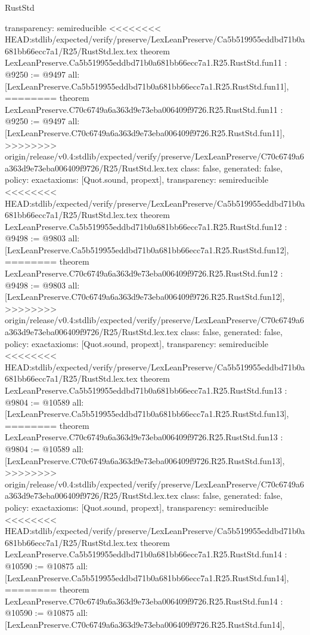 \begin{lexlean}{RustStd}
\begin{coremodule}
{\begin{coremodule}
{{{{{{{{{{{{{{  transparency: semireducible
}
<<<<<<<< HEAD:stdlib/expected/verify/preserve/LexLeanPreserve/Ca5b519955eddbd71b0a681bb66ecc7a1/R25/RustStd.lex.tex
theorem LexLeanPreserve.Ca5b519955eddbd71b0a681bb66ecc7a1.R25.RustStd.fun11 : @9250 := @9497 {
  all: [LexLeanPreserve.Ca5b519955eddbd71b0a681bb66ecc7a1.R25.RustStd.fun11],
========
theorem LexLeanPreserve.C70c6749a6a363d9e73eba006409f9726.R25.RustStd.fun11 : @9250 := @9497 {
  all: [LexLeanPreserve.C70c6749a6a363d9e73eba006409f9726.R25.RustStd.fun11],
>>>>>>>> origin/release/v0.4:stdlib/expected/verify/preserve/LexLeanPreserve/C70c6749a6a363d9e73eba006409f9726/R25/RustStd.lex.tex
  class: false,
  generated: false,
  policy: exact{axioms: [Quot.sound, propext]},
  transparency: semireducible
}
<<<<<<<< HEAD:stdlib/expected/verify/preserve/LexLeanPreserve/Ca5b519955eddbd71b0a681bb66ecc7a1/R25/RustStd.lex.tex
theorem LexLeanPreserve.Ca5b519955eddbd71b0a681bb66ecc7a1.R25.RustStd.fun12 : @9498 := @9803 {
  all: [LexLeanPreserve.Ca5b519955eddbd71b0a681bb66ecc7a1.R25.RustStd.fun12],
========
theorem LexLeanPreserve.C70c6749a6a363d9e73eba006409f9726.R25.RustStd.fun12 : @9498 := @9803 {
  all: [LexLeanPreserve.C70c6749a6a363d9e73eba006409f9726.R25.RustStd.fun12],
>>>>>>>> origin/release/v0.4:stdlib/expected/verify/preserve/LexLeanPreserve/C70c6749a6a363d9e73eba006409f9726/R25/RustStd.lex.tex
  class: false,
  generated: false,
  policy: exact{axioms: [Quot.sound, propext]},
  transparency: semireducible
}
<<<<<<<< HEAD:stdlib/expected/verify/preserve/LexLeanPreserve/Ca5b519955eddbd71b0a681bb66ecc7a1/R25/RustStd.lex.tex
theorem LexLeanPreserve.Ca5b519955eddbd71b0a681bb66ecc7a1.R25.RustStd.fun13 : @9804 := @10589 {
  all: [LexLeanPreserve.Ca5b519955eddbd71b0a681bb66ecc7a1.R25.RustStd.fun13],
========
theorem LexLeanPreserve.C70c6749a6a363d9e73eba006409f9726.R25.RustStd.fun13 : @9804 := @10589 {
  all: [LexLeanPreserve.C70c6749a6a363d9e73eba006409f9726.R25.RustStd.fun13],
>>>>>>>> origin/release/v0.4:stdlib/expected/verify/preserve/LexLeanPreserve/C70c6749a6a363d9e73eba006409f9726/R25/RustStd.lex.tex
  class: false,
  generated: false,
  policy: exact{axioms: [Quot.sound, propext]},
  transparency: semireducible
}
<<<<<<<< HEAD:stdlib/expected/verify/preserve/LexLeanPreserve/Ca5b519955eddbd71b0a681bb66ecc7a1/R25/RustStd.lex.tex
theorem LexLeanPreserve.Ca5b519955eddbd71b0a681bb66ecc7a1.R25.RustStd.fun14 : @10590 := @10875 {
  all: [LexLeanPreserve.Ca5b519955eddbd71b0a681bb66ecc7a1.R25.RustStd.fun14],
========
theorem LexLeanPreserve.C70c6749a6a363d9e73eba006409f9726.R25.RustStd.fun14 : @10590 := @10875 {
  all: [LexLeanPreserve.C70c6749a6a363d9e73eba006409f9726.R25.RustStd.fun14],
}}}}}}}}}}}}}}}}}}
\end{coremodule}}
\end{coremodule}
\end{lexlean}
